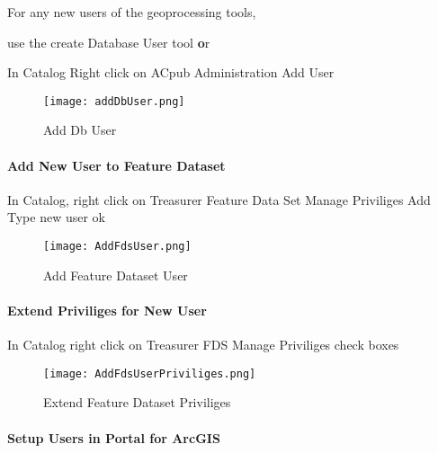 \noindent For any new users of the geoprocessing tools,

use the create Database User tool {\textbf or}
\vspace{.35in}

\noindent In Catalog \rtArrow Right click on ACpub \rtArrow Administration \rtArrow Add User
\begin{figure}[h!]
\centering
    \texttt{[image: addDbUser.png]}
\caption{Add Db User}
\end{figure}
\clearpage
\paragraph[Add New User to Feature Dataset]{\Large Add New User to Feature Dataset\texorpdfstring{\\}{}}
\vspace{.5in}

In Catalog, \rtArrow right click on Treasurer Feature Data Set \rtArrow Manage \rtArrow Priviliges \rtArrow Add \rtArrow Type new user \rtArrow ok
\vspace{.5in}

\begin{figure}[h!]
\centering
    \texttt{[image: AddFdsUser.png]}
\caption{Add Feature Dataset User}
\end{figure}
\clearpage
\paragraph[Extend Priviliges for New User]{\Large Extend Priviliges for New User\texorpdfstring{\\}{}}
\vspace{.5in}

In Catalog \rtArrow right click on Treasurer FDS \rtArrow Manage \rtArrow Priviliges \rtArrow check boxes
\vspace{.5in}

\begin{figure}[h!]
\centering
    \texttt{[image: AddFdsUserPriviliges.png]}
\caption{Extend Feature Dataset Priviliges}
\end{figure}
\clearpage
\paragraph[Setup Users in Portal for ArcGIS]{\Large Setup Users in Portal for ArcGIS\texorpdfstring{\\}{}}
\vspace{.5in}

